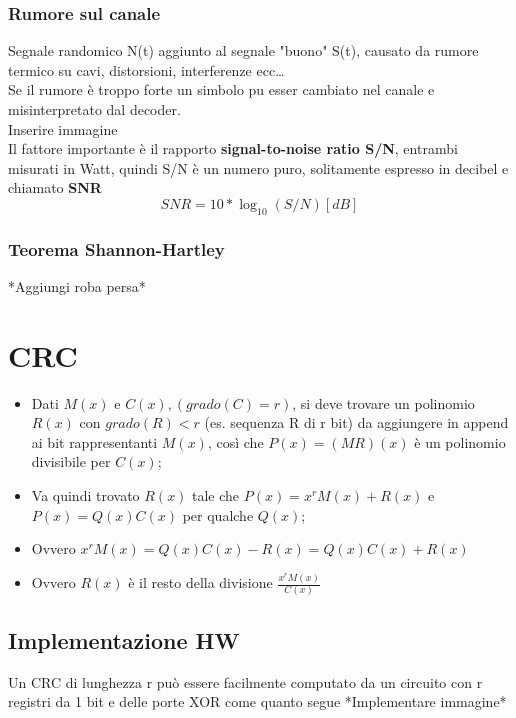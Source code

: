 \documentclass{article}
\begin{document}
        \subsubsection{Rumore sul canale}
          Segnale randomico N(t) aggiunto al segnale "buono" S(t), causato da rumore termico su cavi, distorsioni, interferenze ecc\dots \\
          Se il rumore è troppo forte un simbolo pu esser cambiato nel canale e misinterpretato dal decoder. \\
          Inserire immagine \\
          Il fattore importante è il rapporto \textbf{signal-to-noise ratio S/N}, entrambi misurati in Watt, quindi S/N è un numero puro, solitamente espresso in decibel e chiamato \textbf{SNR}
          $$SNR=10*\log_10(S/N) [dB]$$
        \subsubsection{Teorema Shannon-Hartley}

  *Aggiungi roba persa*
  \section{CRC}
    \begin{itemize}
      \item Dati $M(x)$ e $C(x), (grado(C)=r)$, si deve trovare un polinomio $R(x)$ con $grado(R)<r$ (es. sequenza R di r bit) da aggiungere in append ai bit rappresentanti $M(x)$, così che $P(x)=(MR)(x)$ è un polinomio divisibile per $C(x)$;
      \item Va quindi trovato $R(x)$ tale che $P(x)=x^rM(x)+R(x)$ e $P(x)=Q(x)C(x)$ per qualche $Q(x)$;
      \item Ovvero $x^rM(x) = Q(x)C(x) - R(x) = Q(x)C(x) + R(x)$
      \item Ovvero $R(x)$ è il resto della divisione $\frac{x^rM(x)}{C(x)}$
    \end{itemize} 
    \subsection{Implementazione HW}
      Un CRC di lunghezza r può essere facilmente computato da un circuito con r registri da 1 bit e delle porte XOR come quanto segue
      *Implementare immagine*
\end{document}
